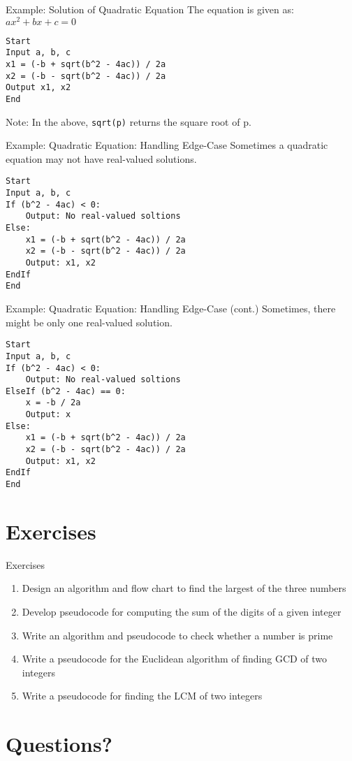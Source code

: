 \documentclass[12pt, aspectratio=169]{beamer}
\begin{document}
    \begin{frame}[fragile]{Example: Solution of Quadratic Equation}
        The equation is given as: $ax^2 + bx + c = 0$
        \begin{verbatim}
Start
Input a, b, c
x1 = (-b + sqrt(b^2 - 4ac)) / 2a
x2 = (-b - sqrt(b^2 - 4ac)) / 2a
Output x1, x2
End
        \end{verbatim}

        Note: In the above, \verb|sqrt(p)| returns the square root of p.
    \end{frame}


    \begin{frame}[fragile]{Example: Quadratic Equation: Handling Edge-Case}
        Sometimes a quadratic equation may not have real-valued solutions.
        \begin{verbatim}
Start
Input a, b, c
If (b^2 - 4ac) < 0:
    Output: No real-valued soltions
Else:
    x1 = (-b + sqrt(b^2 - 4ac)) / 2a
    x2 = (-b - sqrt(b^2 - 4ac)) / 2a
    Output: x1, x2
EndIf
End
        \end{verbatim}
    \end{frame}


    \begin{frame}[fragile]{Example: Quadratic Equation: Handling Edge-Case (cont.)}
        Sometimes, there might be only one real-valued solution.
        \begin{verbatim}
Start
Input a, b, c
If (b^2 - 4ac) < 0:
    Output: No real-valued soltions
ElseIf (b^2 - 4ac) == 0:
    x = -b / 2a
    Output: x
Else:
    x1 = (-b + sqrt(b^2 - 4ac)) / 2a
    x2 = (-b - sqrt(b^2 - 4ac)) / 2a
    Output: x1, x2
EndIf
End
        \end{verbatim}
    \end{frame}


    \section{Exercises}

    \begin{frame}{Exercises}
    \begin{enumerate}
        \item Design an algorithm and flow chart to find the largest of the three numbers
        \item Develop pseudocode for computing the sum of the digits of a given integer
        \item Write an algorithm and pseudocode to check whether a number is prime
        \item Write a pseudocode for the Euclidean algorithm of finding GCD of two integers
        \item Write a pseudocode for finding the LCM of two integers
    \end{enumerate}
    \end{frame}

    \section*{Questions?}
\end{document}
